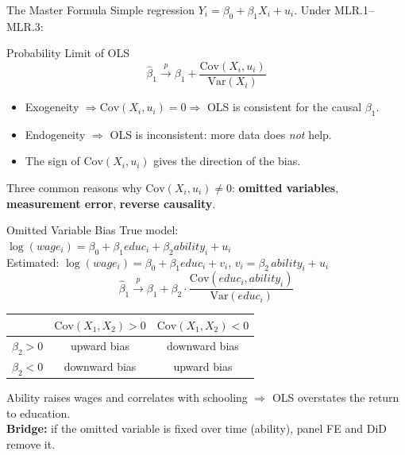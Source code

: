 \documentclass[9pt,aspectratio=169]{beamer}
\newcommand{\Var}{\mathrm{Var}}
\newcommand{\Cov}{\mathrm{Cov}}
\begin{document}
\begin{frame}{The Master Formula}
\linespread{1.2}\selectfont
  Simple regression $Y_i=\beta_0+\beta_1X_i+u_i$. Under MLR.1--MLR.3:
  \begin{block}{Probability Limit of OLS}
  \[
    \hat\beta_1 \xrightarrow{p} \beta_1 + \frac{\Cov(X_i,u_i)}{\Var(X_i)}
  \]
  \end{block}
  \begin{itemize}
    \item Exogeneity $\Rightarrow\Cov(X_i,u_i)=0\Rightarrow$ OLS is consistent for the causal $\beta_1$.
    \item Endogeneity $\Rightarrow$ OLS is inconsistent: more data does \emph{not} help.
    \item The sign of $\Cov(X_i,u_i)$ gives the direction of the bias.
  \end{itemize}
  \medskip
  Three common reasons why $\Cov(X_i,u_i)\neq 0$:
  \textbf{omitted variables}, \textbf{measurement error}, \textbf{reverse causality}.
\end{frame}

\begin{frame}{Omitted Variable Bias}
\linespread{1.2}\selectfont
  True model: $\log(wage_i) = \beta_0 + \beta_1 educ_i + \beta_2 ability_i + u_i$\\
  Estimated:  $\log(wage_i) = \beta_0 + \beta_1 educ_i + v_i$, \quad $v_i=\beta_2\,ability_i+u_i$
  \[
    \hat\beta_1 \xrightarrow{p} \beta_1 + \beta_2\cdot\frac{\Cov(educ_i,ability_i)}{\Var(educ_i)}
  \]
  \centering
  \begin{tabular}{lcc}
    \toprule
    & $\Cov(X_1,X_2)>0$ & $\Cov(X_1,X_2)<0$ \\
    \midrule
    $\beta_2>0$ & upward bias & downward bias \\
    $\beta_2<0$ & downward bias & upward bias \\
    \bottomrule
  \end{tabular}
  \medskip

  \raggedright
  Ability raises wages and correlates with schooling $\Rightarrow$ OLS overstates the return to education.\\
  \textbf{Bridge:} if the omitted variable is fixed over time (ability), panel FE and DiD remove it.
\end{frame}
\end{document}

